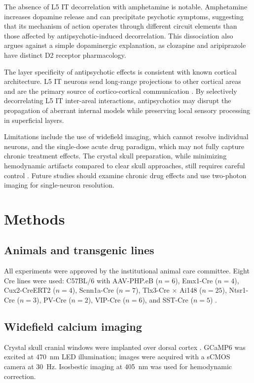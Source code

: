 \documentclass[11pt]{article}
\begin{document}
The absence of L5 IT decorrelation with amphetamine is notable. Amphetamine increases dopamine release and can precipitate psychotic symptoms, suggesting that its mechanism of action operates through different circuit elements than those affected by antipsychotic-induced decorrelation. This dissociation also argues against a simple dopaminergic explanation, as clozapine and aripiprazole have distinct D2 receptor pharmacology.

The layer specificity of antipsychotic effects is consistent with known cortical architecture. L5 IT neurons send long-range projections to other cortical areas and are the primary source of cortico-cortical communication \citep{harris2019hierarchical, gerfen2018long}. By selectively decorrelating L5 IT inter-areal interactions, antipsychotics may disrupt the propagation of aberrant internal models while preserving local sensory processing in superficial layers.

Limitations include the use of widefield imaging, which cannot resolve individual neurons, and the single-dose acute drug paradigm, which may not fully capture chronic treatment effects. The crystal skull preparation, while minimizing hemodynamic artifacts compared to clear skull approaches, still requires careful control \citep{kim2016crystal}. Future studies should examine chronic drug effects and use two-photon imaging for single-neuron resolution.

\section{Methods}

\subsection{Animals and transgenic lines}

All experiments were approved by the institutional animal care committee. Eight Cre lines were used: C57BL/6 with AAV-PHP.eB ($n = 6$), Emx1-Cre ($n = 4$), Cux2-CreERT2 ($n = 4$), Scnn1a-Cre ($n = 7$), Tlx3-Cre $\times$ Ai148 ($n = 25$), Ntsr1-Cre ($n = 3$), PV-Cre ($n = 2$), VIP-Cre ($n = 6$), and SST-Cre ($n = 5$) \citep{daigle2018suite, dana2014thy1}.

\subsection{Widefield calcium imaging}

Crystal skull cranial windows were implanted over dorsal cortex \citep{kim2016crystal}. GCaMP6 was excited at 470~nm LED illumination; images were acquired with a sCMOS camera at 30~Hz. Isosbestic imaging at 405~nm was used for hemodynamic correction.
\end{document}
